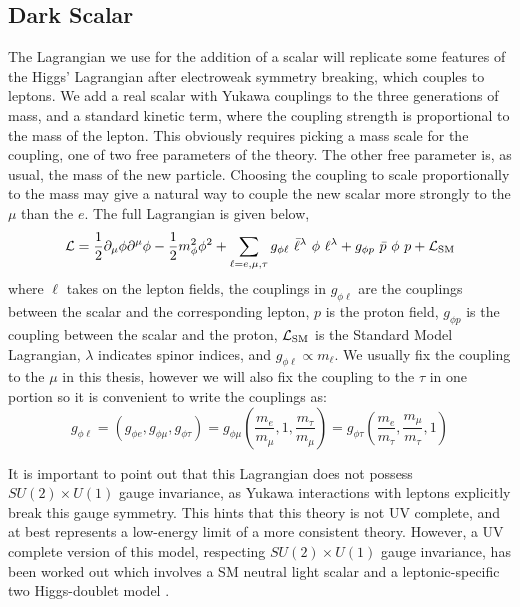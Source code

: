 \subsection{Dark Scalar}
The Lagrangian we use for the addition of a scalar will replicate some features of the Higgs' Lagrangian after electroweak symmetry breaking, which couples to leptons.
We add a real scalar with Yukawa couplings to the three generations of mass, and a standard kinetic term, where the coupling strength is proportional to the mass of the lepton.
This obviously requires picking a mass scale for the coupling, one of two free parameters of the theory.
The other free parameter is, as usual, the mass of the new particle.
Choosing the coupling to scale proportionally to the mass may give a natural way to couple the new scalar more strongly to the $\mu$ than the $e$.
The full Lagrangian is given below,
\begin{equation}
\label{eqn:scalar_lagrangian}
\operatorname{\mathcal{L}} = \frac{1}{2}\partial_\mu \phi \partial^\mu \phi - \frac{1}{2} m_\phi^2 \phi^2 + \sum_{\ell=e,\mu,\tau} g_{\phi \ell}~\bar{\ell}^\lambda~\phi~\ell^\lambda + g_{\phi p}~\bar{p}~\phi~p + \operatorname{\mathcal{L}}_{\textrm{SM}}
\end{equation}
where $\ell$ takes on the lepton fields, the couplings in $g_{\phi \ell}$ are the couplings between the scalar and the corresponding lepton, $p$ is the proton field, $g_{\phi p}$ is the coupling between the scalar and the proton, $\operatorname{\mathcal{L}}_\textrm{SM}$ is the Standard Model Lagrangian, $\lambda$ indicates spinor indices, and $g_{\phi \ell} \propto m_\ell$.
We usually fix the coupling to the $\mu$ in this thesis, however we will also fix the coupling to the $\tau$ in one portion so it is convenient to write the couplings as:
\begin{equation*}
\label{eqn:coupling_mass}
g_{\phi \ell} = \left(g_{\phi e}, g_{\phi \mu}, g_{\phi \tau}\right) = g_{\phi \mu} \left( \frac{m_e}{m_\mu}, 1, \frac{m_\tau}{m_\mu} \right) = g_{\phi \tau} \left( \frac{m_e}{m_\tau}, \frac{m_\mu}{m_\tau}, 1 \right)
\end{equation*}

It is important to point out that this Lagrangian does not possess $SU(2) \times U(1)$ gauge invariance, as Yukawa interactions with leptons explicitly break this gauge symmetry. 
This hints that this theory is not UV complete, and at best represents a low-energy limit of a more consistent theory.
However, a UV complete version of this model, respecting $SU(2) \times U(1)$ gauge invariance, has been worked out which involves a SM neutral light scalar and a leptonic-specific two Higgs-doublet model \cite{Batell:2015unpub}.

